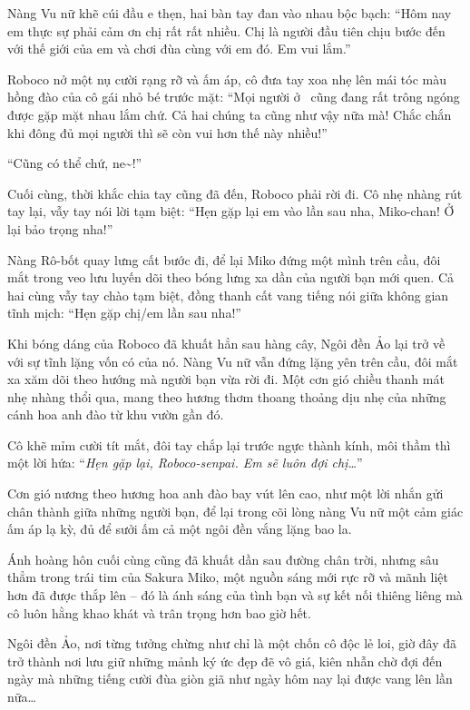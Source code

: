 \documentclass[../main.tex]{subfiles}
\begin{document}
Nàng Vu nữ khẽ cúi đầu e thẹn, hai bàn tay đan vào nhau bộc bạch: ``Hôm nay em thực sự phải cảm ơn chị rất rất nhiều. Chị là người đầu tiên chịu bước đến với thế giới của em và chơi đùa cùng với em đó. Em vui lắm.''


Roboco nở một nụ cười rạng rỡ và ấm áp, cô đưa tay xoa nhẹ lên mái tóc màu hồng đào của cô gái nhỏ bé trước mặt: ``Mọi người ở \hll\ cũng đang rất trông ngóng được gặp mặt nhau lắm chứ. Cả hai chúng ta cũng như vậy nữa mà! Chắc chắn khi đông đủ mọi người thì sẽ còn vui hơn thế này nhiều!''

``Cũng có thể chứ, ne\~{}!''

Cuối cùng, thời khắc chia tay cũng đã đến, Roboco phải rời đi. Cô nhẹ nhàng rút tay lại, vẫy tay nói lời tạm biệt: ``Hẹn gặp lại em vào lần sau nha, Miko-chan! Ở lại bảo trọng nha!''

Nàng Rô-bốt quay lưng cất bước đi, để lại Miko đứng một mình trên cầu, đôi mắt trong veo lưu luyến dõi theo bóng lưng xa dần của người bạn mới quen. Cả hai cùng vẫy tay chào tạm biệt, đồng thanh cất vang tiếng nói giữa không gian tĩnh mịch: ``Hẹn gặp chị/em lần sau nha!''

Khi bóng dáng của Roboco đã khuất hẳn sau hàng cây, Ngôi đền Ảo lại trở về với sự tĩnh lặng vốn có của nó. Nàng Vu nữ vẫn đứng lặng yên trên cầu, đôi mắt xa xăm dõi theo hướng mà người bạn vừa rời đi. Một cơn gió chiều thanh mát nhẹ nhàng thổi qua, mang theo hương thơm thoang thoảng dịu nhẹ của những cánh hoa anh đào từ khu vườn gần đó.

Cô khẽ mỉm cười tít mắt, đôi tay chắp lại trước ngực thành kính, môi thầm thì một lời hứa: ``\textit{Hẹn gặp lại, Roboco-senpai. Em sẽ luôn đợi chị\dots}''

Cơn gió nương theo hương hoa anh đào bay vút lên cao, như một lời nhắn gửi chân thành giữa những người bạn, để lại trong cõi lòng nàng Vu nữ một cảm giác ấm áp lạ kỳ, đủ để sưởi ấm cả một ngôi đền vắng lặng bao la.

Ánh hoàng hôn cuối cùng cũng đã khuất dần sau đường chân trời, nhưng sâu thẳm trong trái tim của Sakura Miko, một nguồn sáng mới rực rỡ và mãnh liệt hơn đã được thắp lên -- đó là ánh sáng của tình bạn và sự kết nối thiêng liêng mà cô luôn hằng khao khát và trân trọng hơn bao giờ hết.

Ngôi đền Ảo, nơi từng tưởng chừng như chỉ là một chốn cô độc lẻ loi, giờ đây đã trở thành nơi lưu giữ những mảnh ký ức đẹp đẽ vô giá, kiên nhẫn chờ đợi đến ngày mà những tiếng cười đùa giòn giã như ngày hôm nay lại được vang lên lần nữa\dots
\end{document}
